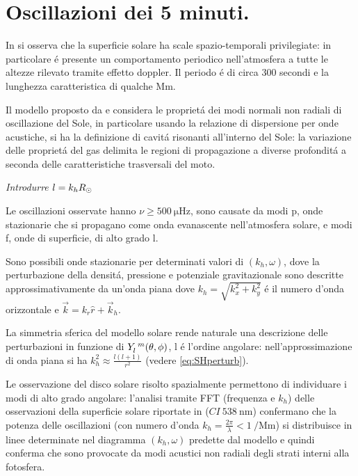 \documentclass[../main.tex]{subfiles}
\begin{document}
\section{Oscillazioni dei 5 minuti.}

In \citet{lei62velocity} si osserva che la superficie solare ha scale spazio-temporali privilegiate: in particolare \'e presente un comportamento periodico nell'atmosfera a tutte le altezze rilevato tramite effetto doppler. Il periodo \'e di circa 300 secondi e la lunghezza caratteristica di qualche \si{\mega\meter}.

Il modello proposto da \citet{ulrich70five} e \citet*{stein71five} considera le propriet\'a dei modi normali non radiali di oscillazione del Sole, in particolare usando la relazione di dispersione per onde acustiche, si ha la definizione di cavit\'a risonanti all'interno del Sole: la variazione delle propriet\'a del gas delimita le regioni di propagazione a diverse profondit\'a a seconda delle caratteristiche trasversali del moto.

{\itshape Introdurre $l=k_hR_{\odot}{}$}

Le oscillazioni osservate hanno $\nu\geq\SI{500}{\micro\hertz}$, sono causate da modi p, onde stazionarie che si propagano come onda evanascente nell'atmosfera solare, e modi f, onde di superficie, di alto grado l.

Sono possibili onde stazionarie per determinati valori di  $(k_h,\omega)$, dove la perturbazione della densit\'a, pressione e potenziale gravitazionale sono descritte approssimativamente da un'onda piana dove $k_h=\sqrt{k_x^2+k_y^2}$ \'e il numero d'onda orizzontale e $\vec{k}=k_r\hat{r}+\vec{k}_h$.

La simmetria sferica del modello solare rende naturale una descrizione delle perturbazioni in funzione di $Y\indices{_l^m}(\theta,\phi)$, l \'e l'ordine angolare: nell'approssimazione di onda piana si ha $k_h^2\approx\frac{l(l+1)}{r^2}$ (vedere \eqref{eq:SHperturb}).

Le osservazione del disco solare risolto spazialmente permettono di individuare i modi di alto grado angolare: l'analisi tramite FFT (frequenza e $k_h$) delle osservazioni della superficie solare riportate in \citet{deu75observations} ($CI\ \SI{538}{\nano\meter}$) confermano che la  potenza delle oscillazioni (con numero d'onda $k_h=\frac{2\pi}{\lambda}<\SI{1}{\per\mega\meter}$) si distribuisce in linee determinate nel diagramma $(k_h,\omega)$ predette dal modello e quindi conferma che sono provocate da modi acustici non radiali degli strati interni alla fotosfera.
\end{document}
